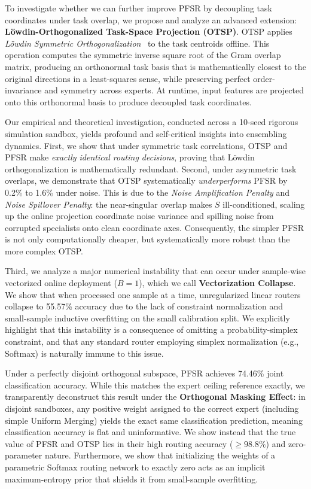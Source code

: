 To investigate whether we can further improve PFSR by decoupling task coordinates under task overlap, we propose and analyze an advanced extension: \textbf{L{\"o}wdin-Orthogonalized Task-Space Projection (OTSP)}. OTSP applies \textit{L{\"o}wdin Symmetric Orthogonalization}~\cite{lowdin1950non} to the task centroids offline. This operation computes the symmetric inverse square root of the Gram overlap matrix, producing an orthonormal task basis that is mathematically closest to the original directions in a least-squares sense, while preserving perfect order-invariance and symmetry across experts. At runtime, input features are projected onto this orthonormal basis to produce decoupled task coordinates.

Our empirical and theoretical investigation, conducted across a 10-seed rigorous simulation sandbox, yields profound and self-critical insights into ensembling dynamics. First, we show that under symmetric task correlations, OTSP and PFSR make \textit{exactly identical routing decisions}, proving that Löwdin orthogonalization is mathematically redundant. Second, under asymmetric task overlaps, we demonstrate that OTSP systematically \textit{underperforms} PFSR by 0.2\% to 1.6\% under noise. This is due to the \textit{Noise Amplification Penalty} and \textit{Noise Spillover Penalty}: the near-singular overlap makes $S$ ill-conditioned, scaling up the online projection coordinate noise variance and spilling noise from corrupted specialists onto clean coordinate axes. Consequently, the simpler PFSR is not only computationally cheaper, but systematically more robust than the more complex OTSP.

Third, we analyze a major numerical instability that can occur under sample-wise vectorized online deployment ($B=1$), which we call \textbf{Vectorization Collapse}. We show that when processed one sample at a time, unregularized linear routers collapse to 55.57\% accuracy due to the lack of constraint normalization and small-sample inductive overfitting on the small calibration split. We explicitly highlight that this instability is a consequence of omitting a probability-simplex constraint, and that any standard router employing simplex normalization (e.g., Softmax) is naturally immune to this issue.

Under a perfectly disjoint orthogonal subspace, PFSR achieves 74.46\% joint classification accuracy. While this matches the expert ceiling reference exactly, we transparently deconstruct this result under the \textbf{Orthogonal Masking Effect}: in disjoint sandboxes, any positive weight assigned to the correct expert (including simple Uniform Merging) yields the exact same classification prediction, meaning classification accuracy is flat and uninformative. We show instead that the true value of PFSR and OTSP lies in their high routing accuracy ($\ge 98.8\%$) and zero-parameter nature. Furthermore, we show that initializing the weights of a parametric Softmax routing network to exactly zero acts as an implicit maximum-entropy prior that shields it from small-sample overfitting.

